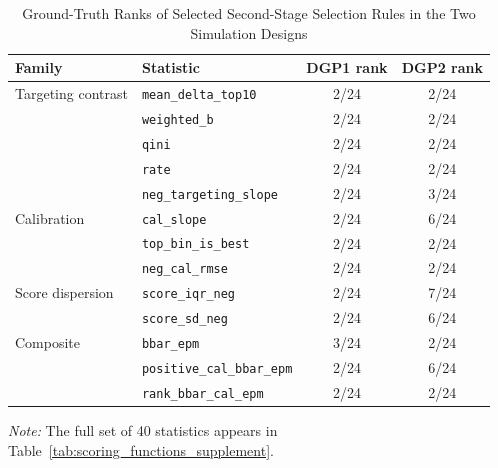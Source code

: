 \begin{table}[ht]
\centering
\caption{Ground-Truth Ranks of Selected Second-Stage Selection Rules in the Two Simulation Designs}
\label{tab:second_stage_ranks}
\small
\setlength{\tabcolsep}{5pt}
\begin{tabular}{@{}llcc@{}}
\toprule
\textbf{Family} & \textbf{Statistic} & \textbf{DGP1 rank} & \textbf{DGP2 rank} \\
\midrule
Targeting contrast & \texttt{mean\_delta\_top10} & 2/24 & 2/24 \\
                   & \texttt{weighted\_b} & 2/24 & 2/24 \\
                   & \texttt{qini} & 2/24 & 2/24 \\
                   & \texttt{rate} & 2/24 & 2/24 \\
                   & \texttt{neg\_targeting\_slope} & 2/24 & 3/24 \\
\midrule
Calibration        & \texttt{cal\_slope} & 2/24 & 6/24 \\
                   & \texttt{top\_bin\_is\_best} & 2/24 & 2/24 \\
                   & \texttt{neg\_cal\_rmse} & 2/24 & 2/24 \\
\midrule
Score dispersion   & \texttt{score\_iqr\_neg} & 2/24 & 7/24 \\
                   & \texttt{score\_sd\_neg} & 2/24 & 6/24 \\
\midrule
Composite          & \texttt{bbar\_epm} & 3/24 & 2/24 \\
                   & \texttt{positive\_cal\_bbar\_epm} & 2/24 & 6/24 \\
                   & \texttt{rank\_bbar\_cal\_epm} & 2/24 & 2/24 \\
\bottomrule
\end{tabular}
\begin{minipage}{0.95\linewidth}
\footnotesize\textit{Note:} The full set of 40 statistics appears in Table~\ref{tab:scoring_functions_supplement}.
\end{minipage}
\end{table}
